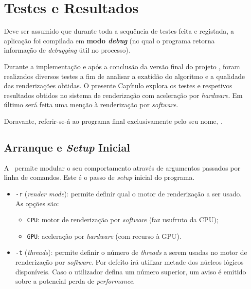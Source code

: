 \chapter{Testes e Resultados}
\label{ch::testes}

Deve ser assumido que durante toda a sequência de testes feita e registada, a aplicação foi compilada em \textbf{modo \textit{debug}} (no qual o programa retorna informação de \textit{debugging} útil no processo).

Durante a implementação e após a conclusão da versão final do projeto \theapp, foram realizados diversos testes a fim de analisar a exatidão do algoritmo e a qualidade das renderizações obtidas. O presente Capítulo explora os testes e respetivos resultados obtidos no sistema de renderização com aceleração por \textit{hardware}. Em último será feita uma menção à renderização por \textit{software}.

Doravante, referir-se-á ao programa final exclusivamente pelo seu nome, \theapp.


\section{Arranque e \textit{Setup} Inicial}
\label{sec::testes::start}

A \theapp~permite modular o seu comportamento através de argumentos passados por linha de comandos. Este é o passo de \textit{setup} inicial do programa.

\begin{itemize}
	\item \verb|-r| (\textit{render mode}): permite definir qual o motor de renderização a ser usado. As opções são:
	\begin{itemize}[nosep]
		\item \verb|CPU|: motor de renderização por \textit{software} (faz usufruto da \ac{CPU});
		\item \verb|GPU|: aceleração por \textit{hardware} (com recurso à \ac{GPU}).
	\end{itemize}
	
	\item \verb|-t| (\textit{threads}): permite definir o número de \textit{threads} a serem usadas no motor de renderização por \textit{software}. Por defeito irá utilizar metade dos núcleos lógicos disponíveis. Caso o utilizador defina um número superior, um aviso é emitido sobre a potencial perda de \textit{performance}.
\end{itemize}

